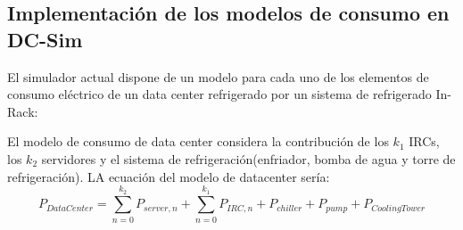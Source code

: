 \subsection{Implementación de los modelos de consumo en DC-Sim}
El simulador actual dispone de un modelo para cada uno de los elementos de consumo eléctrico de un data center refrigerado por un sistema de refrigerado In-Rack:

El modelo de consumo de data center considera la contribución de los $k_{1}$ IRCs, los $k_{2}$ servidores y el sistema de refrigeración(enfriador, bomba de agua y torre de refrigeración). LA ecuación del modelo de datacenter sería:
\begin{equation}
P_{DataCenter}=\displaystyle\sum_{n=0}^{k_{2}} P_{server,n} + \displaystyle\sum_{n=0}^{k_{1}} P_{IRC,n}+P_{chiller} +P_{pump} +P_{CoolingTower}
\end{equation}


